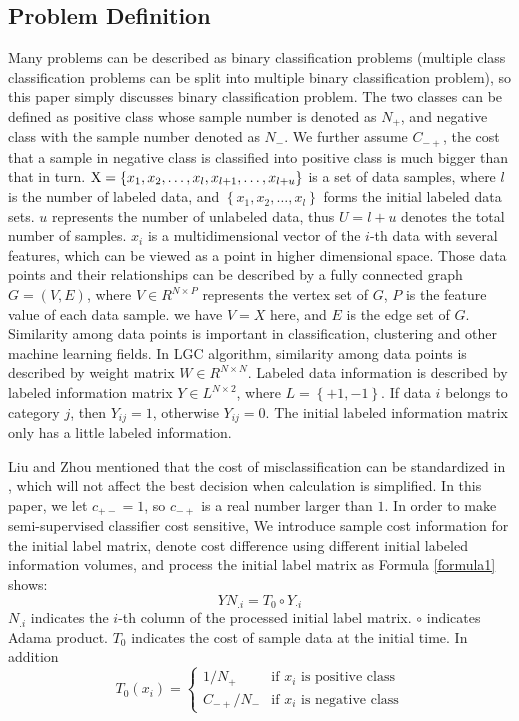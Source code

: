 \documentclass{svjour3}                     %
\begin{document}
\subsection{Problem Definition}
Many problems can be described as binary classification problems (multiple class classification problems can be split into multiple binary classification problem), so this paper simply discusses binary classification problem. The two classes can be defined as positive class whose sample number is denoted as ${N_ + }$, and negative class with the sample number denoted as ${N_ - }$. We further assume $C_{-+}$, the cost that a sample in negative class is classified into positive class is much bigger than that in turn. ${\rm{X}} = \left\{ {{x_1},{x_2}, \ldots ,{x_l},{x_{l + 1}}, \ldots ,{x_{l + u}}} \right\}$ is a set of data samples, where $l$ is the number of labeled data, and $\left\{ {{x_1},{x_2}, \ldots ,{x_l}} \right\}$ forms the initial labeled data sets. $u$ represents the number of unlabeled data, thus $U=l+u$ denotes the total number of samples. ${x_i}$ is a multidimensional vector of the $i$-th data with several features, which can be viewed as a point in higher dimensional space. Those data points and their relationships can be described by a fully connected graph $G = \left( {V,E} \right)$, where $V \in {R^{N \times P}}$ represents the vertex set of $G$, $P$ is the feature value of each data sample. we have $V = X$ here, and $E$ is the edge set of $G$. Similarity among data points is important in classification, clustering and other machine learning fields. In LGC algorithm, similarity among data points is described by weight matrix $W \in {R^{N \times N}}$. Labeled data information is described by labeled information matrix $Y \in {L^{N \times 2}}$, where $L = \left\{ { + 1, - 1} \right\}$. If data $i$ belongs to category $j$, then ${Y_{ij}} = 1$, otherwise ${Y_{ij}} = 0$. The initial labeled information matrix only has a little labeled information.

Liu and Zhou mentioned that the cost of misclassification can be standardized in \cite{liu2006influence}, which will not affect the best decision when calculation is simplified. In this paper, we let ${c_{ +  - }} = 1$, so  ${c_{ - + }}$ is a real number larger than $1$. In order to make semi-supervised classifier cost sensitive, We introduce sample cost information for the initial label matrix, denote cost difference using different initial labeled information volumes, and process the initial label matrix as Formula \ref{formula1} shows:
\begin{equation} \label{formula1}
YN_{.i} = {T_0} \circ {Y_{ \cdot i}} 
\end{equation}
${N_{.i}}$ indicates the $i$-th column of the processed initial label matrix. $\circ $ indicates Adama product. $T_0$ indicates the cost of sample data at the initial time. In addition
\begin{equation}
{T_0}({x_i})=
  \begin{cases}
  1/{N_ +}& \mbox{if } x_i \mbox{ is positive class} \\
  {C_{-+}}/{N_ - } & \mbox{if } x_i \mbox{ is negative class}  
  \end{cases}
\end{equation}
\end{document}
